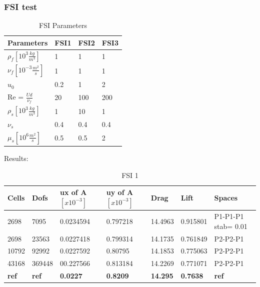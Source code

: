 \subsubsection*{FSI test}
\begin{table}[ht]
\centering
\caption{FSI Parameters}
\label{my-label}
\begin{tabular}{|l|l|l|l|}
\hline
Parameters & FSI1 & FSI2 & FSI3 \\ \hline
$\rho_f[10^3 \frac{kg}{m^3}]$ & 1 & 1 & 1 \\ \hline
$\nu_f [10^{-3} \frac{m^2}{s}]$ & 1 & 1 & 1 \\ \hline
$u_0$ & 0.2 & 1 & 2 \\ \hline
Re = $\frac{U d}{\nu_f}$ & 20 & 100 & 200 \\ \hline
$\rho_s[10^3 \frac{kg}{m^3}]$ & 1 & 10 & 1 \\ \hline
$\nu_s$ & 0.4 & 0.4 & 0.4 \\ \hline
$\mu_s[10^6 \frac{m^2}{s}]$ & 0.5 & 0.5 & 2 \\ \hline
\end{tabular}
\end{table}
Results: 
\begin{table}[h]
\centering
\caption{FSI 1}
\label{my-label}
\begin{tabular}{|l|l|l|l|l|l|l|}
\hline
Cells & Dofs & ux of A $[x10^{-3}]$ & uy of A $[x10^{-3}]$ & Drag & Lift & Spaces \\ \hline
2698 & 7095 & 0.0234594 & 0.797218  & 14.4963 & 0.915801 & P1-P1-P1 stab= 0.01 \\ \hline
2698 & 23563 &0.0227418 &0.799314  &  14.1735 &0.761849 & P2-P2-P1 \\ \hline
10792 & 92992  &0.0227592 & 0.80795 & 14.1853 &  0.775063 &  P2-P2-P1 \\ \hline
43168 & 369448 & 00.227566 & 0.813184 & 14.2269 & 0.771071 & P2-P2-P1 \\ \hline
\textbf{ref} & \textbf{ref} & \textbf{0.0227} & \textbf{0.8209} & \textbf{14.295} & \textbf{0.7638} & \textbf{ref} \\ \hline
\end{tabular}
\end{table}
